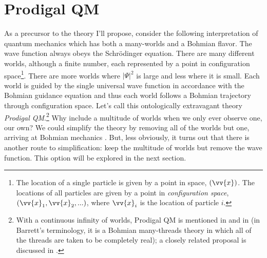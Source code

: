 \documentclass[onecolumn,secnumarabic,balancelastpage,amsmath,amssymb,nofootinbib]{article}
\begin{document}
\section{Prodigal QM}

As a precursor to the theory I'll propose, consider the following interpretation of quantum mechanics which has both a many-worlds and a Bohmian flavor.  The wave function always obeys the Schr\"{o}dinger equation.  There are many different worlds, although a finite number, each represented by a point in configuration space\footnote{The location of a single particle is given by a point in space, $(\vv{x})$.  The locations of all particles are given by a point in \emph{configuration space}, $(\vv{x}_1,\vv{x}_2,...)$, where $\vv{x}_i$ is the location of particle $i$.}.  There are more worlds where $|\Psi|^2$ is large and less where it is small.  Each world is guided by the single universal wave function in accordance with the Bohmian guidance equation and thus each world follows a Bohmian trajectory through configuration space.  Let's call this ontologically extravagant theory \emph{Prodigal QM}.\footnote{With a continuous infinity of worlds, Prodigal QM is mentioned in \citet[][]{valentini2010} and in \citet{barrett1999} (in Barrett's terminology, it is a Bohmian many-threads theory in which all of the threads are taken to be completely real); a closely related proposal is discussed in \citet{dorr2009}.}  Why include a multitude of worlds when we only ever observe one, our own?  We could simplify the theory by removing all of the worlds but one, arriving at Bohmian mechanics \citep[][]{valentini2010}.  But, less obviously, it turns out that there is another route to simplification: keep the multitude of worlds but remove the wave function.  This option will be explored in the next section.
\end{document}
